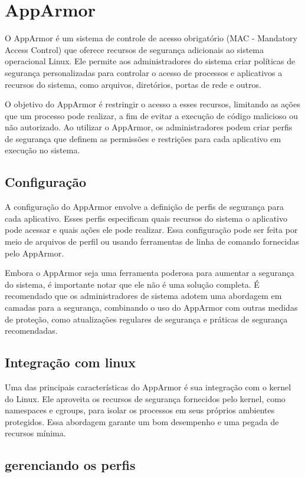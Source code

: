 \section{AppArmor}
O AppArmor é um sistema de controle de acesso obrigatório (MAC - Mandatory Access Control) que oferece recursos de segurança adicionais ao sistema operacional Linux. Ele permite aos administradores do sistema criar políticas de segurança personalizadas para controlar o acesso de processos e aplicativos a recursos do sistema, como arquivos, diretórios, portas de rede e outros.

O objetivo do AppArmor é restringir o acesso a esses recursos, limitando as ações que um processo pode realizar, a fim de evitar a execução de código malicioso ou não autorizado. Ao utilizar o AppArmor, os administradores podem criar perfis de segurança que definem as permissões e restrições para cada aplicativo em execução no sistema.

\subsection{Configuração}
A configuração do AppArmor envolve a definição de perfis de segurança para cada aplicativo. Esses perfis especificam quais recursos do sistema o aplicativo pode acessar e quais ações ele pode realizar. Essa configuração pode ser feita por meio de arquivos de perfil ou usando ferramentas de linha de comando fornecidas pelo AppArmor.

Embora o AppArmor seja uma ferramenta poderosa para aumentar a segurança do sistema, é importante notar que ele não é uma solução completa. É recomendado que os administradores de sistema adotem uma abordagem em camadas para a segurança, combinando o uso do AppArmor com outras medidas de proteção, como atualizações regulares de segurança e práticas de segurança recomendadas.

\subsection{Integração com linux}

Uma das principais características do AppArmor é sua integração com o kernel do Linux. Ele aproveita os recursos de segurança fornecidos pelo kernel, como namespaces e cgroups, para isolar os processos em seus próprios ambientes protegidos. Essa abordagem garante um bom desempenho e uma pegada de recursos mínima.

\subsection{gerenciando os perfis}


